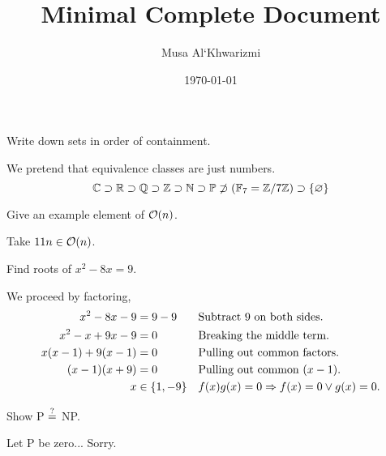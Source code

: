 \documentclass{homework}
\author{Musa Al`Khwarizmi}
\date{\today}
\title{Minimal Complete Document}
\begin{document}
 \maketitle

\question Write down sets in order of containment.

We pretend that equivalence classes are just numbers.
\[
  \C \supset \R \supset \Q \supset \Z \supset \N \supset
  \P \not\supset (\GF[7] = \modulo[7])  \supset \{\nil\}
\]

\question Give an example element of $\O(n)$.

Take $11n \in \O(n)$.

\question Find roots of $x^2- 8x = 9$.

We proceed by factoring,
\begin{align*}
  x^2- 8x - 9         &= 9-9 && \text{Subtract 9 on both sides.}         \\
  x^2- x + 9x - 9     &= 0   && \text{Breaking the middle term.}         \\
  x(x - 1) + 9(x - 1) &= 0   && \text{Pulling out common factors.}       \\
  (x - 1)(x + 9)      &= 0   && \text{Pulling out common } (x - 1).      \\
  x           &\in \{1, -9\} && f(x)g(x) = 0 \Ra f(x) = 0 \vee g(x) = 0. \\
\end{align*}

\question Show P $\?$ NP.

Let P be zero... Sorry.
\end{document}
